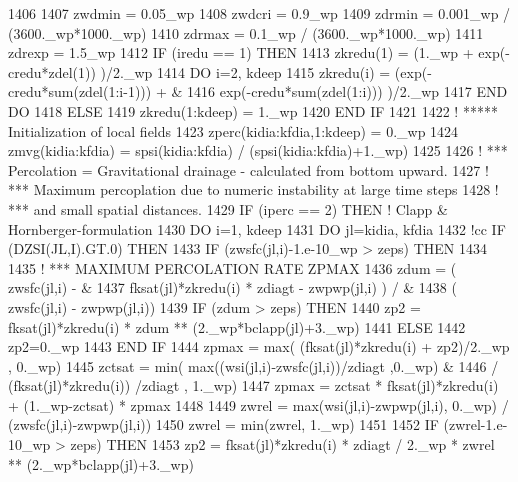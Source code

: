 \begin{DoxyCode}
1406 
1407   zwdmin = 0.05\_wp
1408   zwdcri = 0.9\_wp
1409   zdrmin = 0.001\_wp / (3600.\_wp*1000.\_wp)
1410   zdrmax = 0.1\_wp / (3600.\_wp*1000.\_wp)
1411   zdrexp = 1.5\_wp
1412   \textcolor{keywordflow}{IF} (iredu == 1) \textcolor{keywordflow}{THEN}
1413     zkredu(1) = (1.\_wp + exp(-credu*zdel(1)) )/2.\_wp
1414     \textcolor{keywordflow}{DO} i=2, kdeep
1415       zkredu(i) = (exp(-credu*sum(zdel(1:i-1))) +  &
1416           exp(-credu*sum(zdel(1:i))) )/2.\_wp
1417 \textcolor{keywordflow}{    END DO}
1418   \textcolor{keywordflow}{ELSE}
1419     zkredu(1:kdeep) = 1.\_wp
1420 \textcolor{keywordflow}{  END IF}
1421 
1422 \textcolor{comment}{!     ***** Initialization of local fields}
1423   zperc(kidia:kfdia,1:kdeep) = 0.\_wp
1424   zmvg(kidia:kfdia) = spsi(kidia:kfdia) / (spsi(kidia:kfdia)+1.\_wp)
1425 
1426 \textcolor{comment}{!     *** Percolation = Gravitational drainage - calculated from bottom upward.}
1427 \textcolor{comment}{!     *** Maximum percoplation due to numeric instability at large time steps}
1428 \textcolor{comment}{!     *** and small spatial distances.}
1429   \textcolor{keywordflow}{IF} (iperc == 2) \textcolor{keywordflow}{THEN}          \textcolor{comment}{! Clapp & Hornberger-formulation}
1430     \textcolor{keywordflow}{DO} i=1, kdeep
1431       \textcolor{keywordflow}{DO} jl=kidia, kfdia
1432 \textcolor{comment}{!cc        IF (DZSI(JL,I).GT.0) THEN}
1433         \textcolor{keywordflow}{IF} (zwsfc(jl,i)-1.e-10\_wp > zeps) \textcolor{keywordflow}{THEN}
1434 
1435 \textcolor{comment}{!         *** MAXIMUM PERCOLATION RATE ZPMAX}
1436           zdum = ( zwsfc(jl,i) -  &
1437               fksat(jl)*zkredu(i) * zdiagt - zwpwp(jl,i) ) /  &
1438               ( zwsfc(jl,i) - zwpwp(jl,i))
1439           \textcolor{keywordflow}{IF} (zdum > zeps) \textcolor{keywordflow}{THEN}
1440             zp2 = fksat(jl)*zkredu(i) * zdum ** (2.\_wp*bclapp(jl)+3.\_wp)
1441           \textcolor{keywordflow}{ELSE}
1442             zp2=0.\_wp
1443 \textcolor{keywordflow}{          END IF}
1444           zpmax  = max( (fksat(jl)*zkredu(i) + zp2)/2.\_wp , 0.\_wp)
1445           zctsat = min( max((wsi(jl,i)-zwsfc(jl,i))/zdiagt ,0.\_wp)  &
1446               / (fksat(jl)*zkredu(i)) /zdiagt , 1.\_wp)
1447           zpmax  = zctsat * fksat(jl)*zkredu(i) + (1.\_wp-zctsat) * zpmax
1448 
1449           zwrel  = max(wsi(jl,i)-zwpwp(jl,i), 0.\_wp) / (zwsfc(jl,i)-zwpwp(jl,i))
1450           zwrel  = min(zwrel, 1.\_wp)
1451 
1452           \textcolor{keywordflow}{IF} (zwrel-1.e-10\_wp > zeps) \textcolor{keywordflow}{THEN}
1453             zp2   = fksat(jl)*zkredu(i) * zdiagt / 2.\_wp * zwrel ** (2.\_wp*bclapp(jl)+3.\_wp)

\end{DoxyCode}
